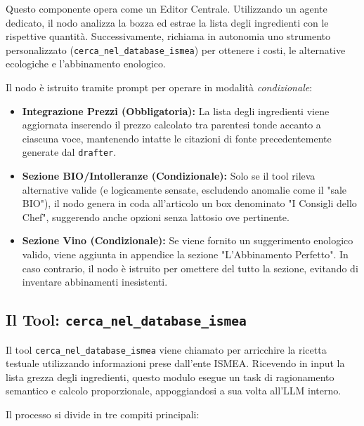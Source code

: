 \documentclass[11pt, a4paper]{article}
\begin{document}
Questo componente opera come un Editor Centrale. Utilizzando un agente dedicato, il nodo analizza la bozza ed estrae la lista degli ingredienti con le rispettive quantità. Successivamente, richiama in autonomia uno strumento personalizzato (\texttt{cerca\_nel\_database\_ismea}) per ottenere i costi, le alternative ecologiche e l'abbinamento enologico. 

Il nodo è istruito tramite prompt per operare in modalità \textit{condizionale}:
\begin{itemize}
    \item \textbf{Integrazione Prezzi (Obbligatoria):} La lista degli ingredienti viene aggiornata inserendo il prezzo calcolato tra parentesi tonde accanto a ciascuna voce, mantenendo intatte le citazioni di fonte precedentemente generate dal \texttt{drafter}.
    \item \textbf{Sezione BIO/Intolleranze (Condizionale):} Solo se il tool rileva alternative valide (e logicamente sensate, escludendo anomalie come il "sale BIO"), il nodo genera in coda all'articolo un box denominato "I Consigli dello Chef", suggerendo anche opzioni senza lattosio ove pertinente.
    \item \textbf{Sezione Vino (Condizionale):} Se viene fornito un suggerimento enologico valido, viene aggiunta in appendice la sezione "L'Abbinamento Perfetto". In caso contrario, il nodo è istruito per omettere del tutto la sezione, evitando di inventare abbinamenti inesistenti.
\end{itemize}

\subsection{Il Tool: \texttt{cerca\_nel\_database\_ismea}}

Il tool \texttt{cerca\_nel\_database\_ismea} viene chiamato per arricchire la ricetta testuale utilizzando informazioni prese dall'ente ISMEA. Ricevendo in input la lista grezza degli ingredienti, questo modulo esegue un task di ragionamento semantico e calcolo proporzionale, appoggiandosi a sua volta all'LLM interno.

Il processo si divide in tre compiti principali:
\end{document}
